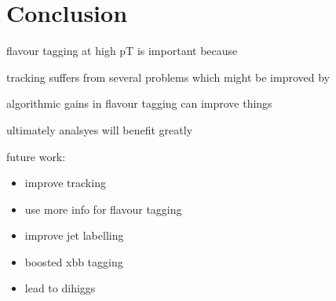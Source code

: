 \chapter{Conclusion}
\label{chap:conclusion}

flavour tagging at high pT is important because

tracking suffers from several problems which might be improved by

algorithmic gains in flavour tagging can improve things

ultimately analsyes will benefit greatly


future work:
\begin{itemize}
    \item improve tracking
    \item use more info for flavour tagging
    \item improve jet labelling
    \item boosted xbb tagging
    \item lead to dihiggs
\end{itemize}
